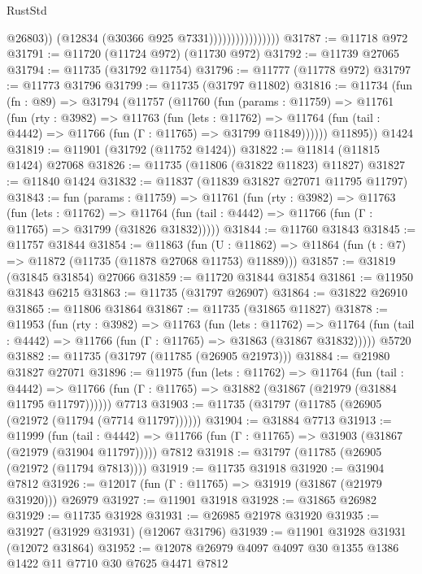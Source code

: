 \begin{lexlean}{RustStd}
\begin{coremodule}
                                    @26803))
                                (@12834 (@30366 @925 @7331))))))))))))))))
@31787 := @11718 @972
@31791 := @11720 (@11724 @972) (@11730 @972)
@31792 := @11739 @27065
@31794 := @11735 (@31792 @11754)
@31796 := @11777 (@11778 @972)
@31797 := @11773 @31796
@31799 := @11735 (@31797 @11802)
@31816 := @11734
    (fun (fn : @89) =>
    @31794
      (@11757
        (@11760
          (fun (params : @11759) =>
          @11761
            (fun (rty : @3982) =>
            @11763
              (fun (lets : @11762) =>
              @11764 (fun (tail : @4442) => @11766 (fun (Γ : @11765) => @31799 @11849))))))
        @11895))
    @1424
@31819 := @11901 (@31792 (@11752 @1424))
@31822 := @11814 (@11815 @1424) @27068
@31826 := @11735 (@11806 (@31822 @11823) @11827)
@31827 := @11840 @1424
@31832 := @11837 (@11839 @31827 @27071 @11795 @11797)
@31843 := fun (params : @11759) =>
  @11761
    (fun (rty : @3982) =>
    @11763
      (fun (lets : @11762) =>
      @11764 (fun (tail : @4442) => @11766 (fun (Γ : @11765) => @31799 (@31826 @31832)))))
@31844 := @11760 @31843
@31845 := @11757 @31844
@31854 := @11863
    (fun (U : @11862) => @11864 (fun (t : @7) => @11872 (@11735 (@11878 @27068 @11753) @11889)))
@31857 := @31819 (@31845 @31854) @27066
@31859 := @11720 @31844 @31854
@31861 := @11950 @31843 @6215
@31863 := @11735 (@31797 @26907)
@31864 := @31822 @26910
@31865 := @11806 @31864
@31867 := @11735 (@31865 @11827)
@31878 := @11953
    (fun (rty : @3982) =>
    @11763
      (fun (lets : @11762) =>
      @11764 (fun (tail : @4442) => @11766 (fun (Γ : @11765) => @31863 (@31867 @31832)))))
    @5720
@31882 := @11735 (@31797 (@11785 (@26905 @21973)))
@31884 := @21980 @31827 @27071
@31896 := @11975
    (fun (lets : @11762) =>
    @11764
      (fun (tail : @4442) =>
      @11766 (fun (Γ : @11765) => @31882 (@31867 (@21979 (@31884 @11795 @11797))))))
    @7713
@31903 := @11735 (@31797 (@11785 (@26905 (@21972 (@11794 (@7714 @11797))))))
@31904 := @31884 @7713
@31913 := @11999
    (fun (tail : @4442) => @11766 (fun (Γ : @11765) => @31903 (@31867 (@21979 (@31904 @11797)))))
    @7812
@31918 := @31797 (@11785 (@26905 (@21972 (@11794 @7813))))
@31919 := @11735 @31918
@31920 := @31904 @7812
@31926 := @12017 (fun (Γ : @11765) => @31919 (@31867 (@21979 @31920))) @26979
@31927 := @11901 @31918
@31928 := @31865 @26982
@31929 := @11735 @31928
@31931 := @26985 @21978 @31920
@31935 := @31927 (@31929 @31931) (@12067 @31796)
@31939 := @11901 @31928 @31931 (@12072 @31864)
@31952 := @12078 @26979 @4097 @4097 @30 @1355 @1386 @1422 @11 @7710 @30 @7625 @4471 @7812

\end{coremodule}
\end{lexlean}
